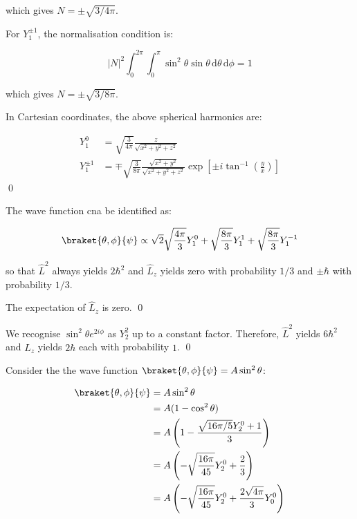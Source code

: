 \documentclass[12pt]{article}
\begin{document}
which gives $N = \pm \sqrt{3/4\pi}$. 

For $Y_{1}^{\pm 1}$, the normalisation condition is:

\begin{equation}
    \left\lvert N \right\rvert^{2} \int_{0}^{2\pi} \int_{0}^{\pi} \sin^{2}{\theta} \sin{\theta} \, \mathrm{d}\theta \, \mathrm{d}\phi = 1
\end{equation}

which gives $N = \pm \sqrt{3/8\pi}$.

In Cartesian coordinates, the above spherical harmonics are:

\begin{equation}
\begin{split}
    Y_{1}^{0} &= \sqrt{\frac{3}{4\pi}} \frac{z}{\sqrt{x^{2} + y^{2} + z^{2}}} \\
    Y_{1}^{\pm 1} &= \mp \sqrt{\frac{3}{8\pi}} \frac{\sqrt{x^{2} + y^{2}}}{\sqrt{x^{2} + y^{2} + z^{2}}} \exp \left[ \pm i \tan^{-1}{\left( \frac{y}{x} \right)} \right]
\end{split}
\end{equation}
\qed


The wave function cna be identified as:

\begin{equation}
    \braket{\theta, \phi}{\psi} \propto \sqrt{2} \sqrt{\frac{4\pi}{3}} Y_{1}^{0} + \sqrt{\frac{8\pi}{3}} Y_{1}^{1} + \sqrt{\frac{8\pi}{3}} Y_{1}^{-1}
\end{equation}

so that $\hat{L}^{2}$ always yields $2\hbar^{2}$ and $\hat{L}_{z}$ yields zero with probability $1/3$ and $\pm \hbar$ with probability $1/3$.

The expectation of $\hat{L}_{z}$ is zero.
\qed


We recognise $\sin^{2}{\theta} e^{2i\phi}$ as $Y_{2}^{2}$ up to a constant factor. Therefore, $\hat{L}^{2}$ yields $6\hbar^{2}$ and $\hat{L}_{z}$ yields $2\hbar$ each with probability $1$.
\qed


Consider the the wave function $\braket{\theta, \phi}{\psi} = A \sin^{2}{\theta}$:

\begin{equation}
\begin{split}
    \braket{\theta, \phi}{\psi} &= A \sin^{2}{\theta} \\
    &= A (1 - \cos^{2}{\theta}) \\
    &= A \left( 1 - \frac{\sqrt{16\pi/5}Y_{2}^{0} + 1}{3} \right) \\
    &= A \left( - \sqrt{\frac{16\pi}{45}} Y_{2}^{0} + \frac{2}{3} \right) \\
    &= A \left( - \sqrt{\frac{16\pi}{45}} Y_{2}^{0} + \frac{2\sqrt{4\pi}}{3} Y_{0}^{0} \right) \\
\end{split}
\end{equation}
\end{document}
